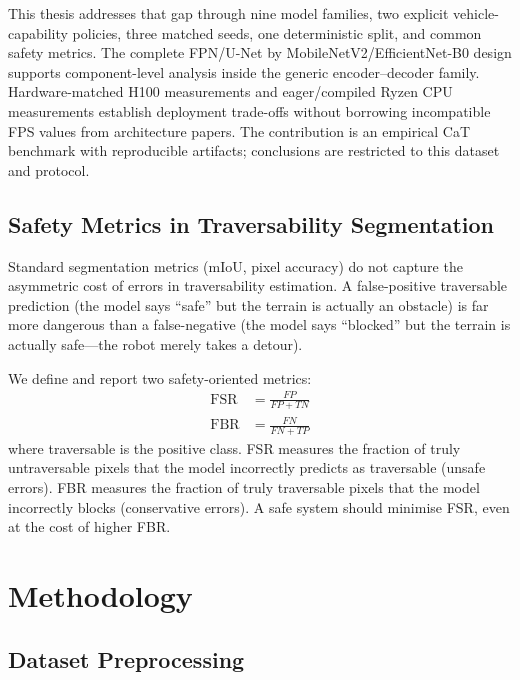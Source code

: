 \documentclass[12pt,a4paper]{report}
\begin{document}
This thesis addresses that gap through nine model families, two explicit
vehicle-capability policies, three matched seeds, one deterministic split, and
common safety metrics. The complete FPN/U-Net by MobileNetV2/EfficientNet-B0
design supports component-level analysis inside the generic encoder--decoder
family. Hardware-matched H100 measurements and eager/compiled Ryzen CPU
measurements establish deployment trade-offs without borrowing incompatible
FPS values from architecture papers. The contribution is an empirical CaT
benchmark with reproducible artifacts; conclusions are restricted to this
dataset and protocol.

\section{Safety Metrics in Traversability Segmentation}

Standard segmentation metrics (mIoU, pixel accuracy) do not capture the asymmetric cost of errors in traversability estimation.
A false-positive traversable prediction (the model says ``safe'' but the terrain is actually an obstacle) is far more dangerous than a false-negative (the model says ``blocked'' but the terrain is actually safe---the robot merely takes a detour).

We define and report two safety-oriented metrics:
\begin{align}
\mathrm{FSR} &= \frac{FP}{FP + TN} \label{eq:fsr} \\
\mathrm{FBR} &= \frac{FN}{FN + TP} \label{eq:fbr}
\end{align}
where traversable is the positive class.
FSR measures the fraction of truly untraversable pixels that the model incorrectly predicts as traversable (unsafe errors).
FBR measures the fraction of truly traversable pixels that the model incorrectly blocks (conservative errors).
A safe system should minimise FSR, even at the cost of higher FBR.


\chapter{Methodology}
\label{sec:methodology}

\section{Dataset Preprocessing}
\end{document}
